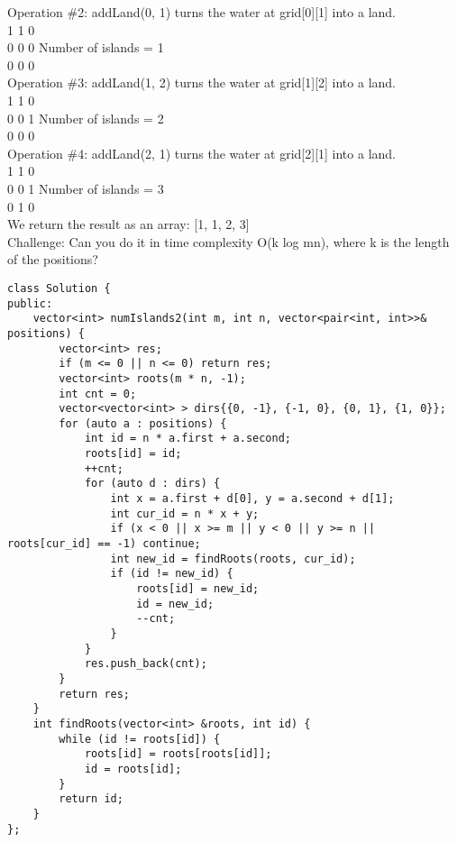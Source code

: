 Operation \#2: addLand(0, 1) turns the water at grid[0][1] into a land.\\
1 1 0\\
0 0 0   Number of islands = 1\\
0 0 0\\

Operation \#3: addLand(1, 2) turns the water at grid[1][2] into a land.\\
1 1 0\\
0 0 1   Number of islands = 2\\
0 0 0\\

Operation \#4: addLand(2, 1) turns the water at grid[2][1] into a land.\\
1 1 0\\
0 0 1   Number of islands = 3\\
0 1 0\\

We return the result as an array: [1, 1, 2, 3]\\

Challenge: Can you do it in time complexity O(k log mn), where k is the length of the positions?\\

\begin{lstlisting}
class Solution {
public:
    vector<int> numIslands2(int m, int n, vector<pair<int, int>>& positions) {
        vector<int> res;
        if (m <= 0 || n <= 0) return res;
        vector<int> roots(m * n, -1);
        int cnt = 0;
        vector<vector<int> > dirs{{0, -1}, {-1, 0}, {0, 1}, {1, 0}};
        for (auto a : positions) {
            int id = n * a.first + a.second;
            roots[id] = id;
            ++cnt;
            for (auto d : dirs) {
                int x = a.first + d[0], y = a.second + d[1];
                int cur_id = n * x + y;
                if (x < 0 || x >= m || y < 0 || y >= n || roots[cur_id] == -1) continue;
                int new_id = findRoots(roots, cur_id);
                if (id != new_id) {
                    roots[id] = new_id;
                    id = new_id;
                    --cnt;
                }
            }
            res.push_back(cnt);
        }
        return res;
    }
    int findRoots(vector<int> &roots, int id) {
        while (id != roots[id]) {
            roots[id] = roots[roots[id]];
            id = roots[id];
        }
        return id;
    }
};
\end{lstlisting}
